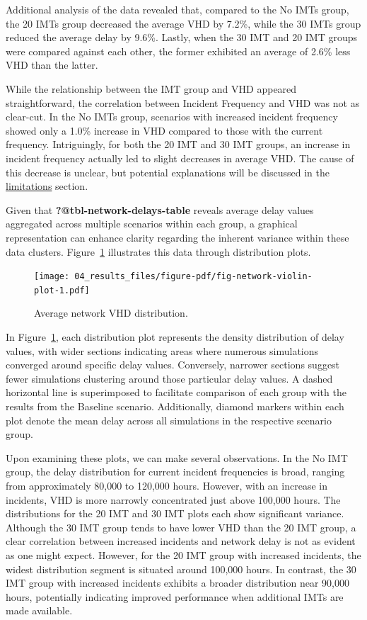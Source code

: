 \documentclass[fancy, oneside, mastersfancy, ms]{byuthesis}
\begin{document}
Additional analysis of the data revealed that, compared to the No IMTs
group, the 20 IMTs group decreased the average VHD by 7.2\%, while the
30 IMTs group reduced the average delay by 9.6\%. Lastly, when the 30
IMT and 20 IMT groups were compared against each other, the former
exhibited an average of 2.6\% less VHD than the latter.

While the relationship between the IMT group and VHD appeared
straightforward, the correlation between Incident Frequency and VHD was
not as clear-cut. In the No IMTs group, scenarios with increased
incident frequency showed only a 1.0\% increase in VHD compared to those
with the current frequency. Intriguingly, for both the 20 IMT and 30 IMT
groups, an increase in incident frequency actually led to slight
decreases in average VHD. The cause of this decrease is unclear, but
potential explanations will be discussed in the
\protect\hyperlink{sec-limitations}{limitations} section.

Given that \textbf{?@tbl-network-delays-table} reveals average delay
values aggregated across multiple scenarios within each group, a
graphical representation can enhance clarity regarding the inherent
variance within these data clusters.
Figure~\ref{fig-network-violin-plot} illustrates this data through
distribution plots.

\begin{figure}

{\centering \texttt{[image: 04\_results\_files/figure-pdf/fig-network-violin-plot-1.pdf]}

}

\caption{\label{fig-network-violin-plot}Average network VHD
distribution.}

\end{figure}

In Figure~\ref{fig-network-violin-plot}, each distribution plot
represents the density distribution of delay values, with wider sections
indicating areas where numerous simulations converged around specific
delay values. Conversely, narrower sections suggest fewer simulations
clustering around those particular delay values. A dashed horizontal
line is superimposed to facilitate comparison of each group with the
results from the Baseline scenario. Additionally, diamond markers within
each plot denote the mean delay across all simulations in the respective
scenario group.

Upon examining these plots, we can make several observations. In the No
IMT group, the delay distribution for current incident frequencies is
broad, ranging from approximately 80,000 to 120,000 hours. However, with
an increase in incidents, VHD is more narrowly concentrated just above
100,000 hours. The distributions for the 20 IMT and 30 IMT plots each
show significant variance. Although the 30 IMT group tends to have lower
VHD than the 20 IMT group, a clear correlation between increased
incidents and network delay is not as evident as one might expect.
However, for the 20 IMT group with increased incidents, the widest
distribution segment is situated around 100,000 hours. In contrast, the
30 IMT group with increased incidents exhibits a broader distribution
near 90,000 hours, potentially indicating improved performance when
additional IMTs are made available.
\end{document}
